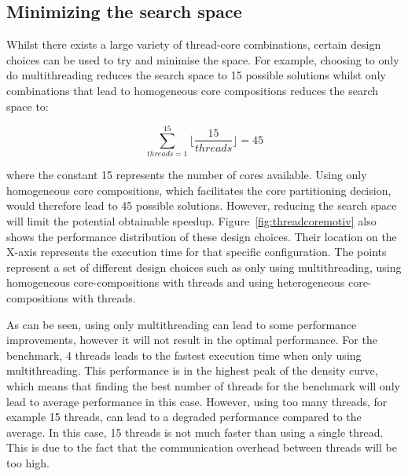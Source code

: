 \subsection{Minimizing the search space}
Whilst there exists a large variety of thread-core combinations, certain design choices can be used to try and minimise the space.
For example, choosing to only do multithreading reduces the search space to 15 possible solutions whilst only combinations that lead to homogeneous core compositions reduces the search space to:

\begin{equation}
\sum_{threads=1}^{15} \lfloor\frac{15}{threads}\rfloor= 45
\end{equation}

where the constant 15 represents the number of cores available.
Using only homogeneous core compositions, which facilitates the core partitioning decision, would therefore lead to 45 possible solutions.
However, reducing the search space will limit the potential obtainable speedup.
Figure~\ref{fig:threadcoremotiv} also shows the performance distribution of these design choices.
Their location on the X-axis represents the execution time for that specific configuration.
The points represent a set of different design choices such as only using multithreading, using homogeneous core-compositions with threads and using heterogeneous core-compositions with threads.

As can be seen, using only multithreading can lead to some performance improvements, however it will not result in the optimal performance.
For the  benchmark, 4 threads leads to the fastest execution time when only using multithreading.
This performance is in the highest peak of the density curve, which means that finding the best number of threads for the benchmark will only lead to average performance in this case.
However, using too many threads, for example 15 threads, can lead to a degraded performance compared to the average.
In this case, 15 threads is not much faster than using a single thread.
This is due to the fact that the communication overhead between threads will be too high.

